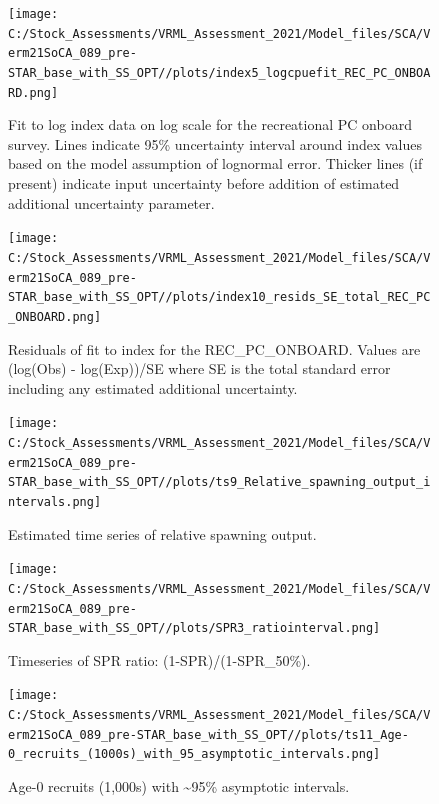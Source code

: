 \documentclass[11pt,
  english,
  a4paper,
]{article}
\begin{document}
\begin{figure}
\centering
\texttt{[image: C:/Stock\_Assessments/VRML\_Assessment\_2021/Model\_files/SCA/Verm21SoCA\_089\_pre-STAR\_base\_with\_SS\_OPT//plots/index5\_logcpuefit\_REC\_PC\_ONBOARD.png]}
\caption{Fit to log index data on log scale for the recreational PC onboard survey. Lines indicate 95\% uncertainty interval around index values based on the model assumption of lognormal error. Thicker lines (if present) indicate input uncertainty before addition of estimated additional uncertainty parameter.\label{fig:log-cpue-REC-PC-ONBOARD}}
\end{figure}

\begin{figure}
\centering
\texttt{[image: C:/Stock\_Assessments/VRML\_Assessment\_2021/Model\_files/SCA/Verm21SoCA\_089\_pre-STAR\_base\_with\_SS\_OPT//plots/index10\_resids\_SE\_total\_REC\_PC\_ONBOARD.png]}
\caption{Residuals of fit to index for the REC\_PC\_ONBOARD. Values are (log(Obs) - log(Exp))/SE where SE is the total standard error including any estimated additional uncertainty.\label{fig:cpue-resid-REC-PC-ONBOARD}}
\end{figure}

\FloatBarrier

\FloatBarrier

\begin{figure}
\centering
\texttt{[image: C:/Stock\_Assessments/VRML\_Assessment\_2021/Model\_files/SCA/Verm21SoCA\_089\_pre-STAR\_base\_with\_SS\_OPT//plots/ts9\_Relative\_spawning\_output\_intervals.png]}
\caption{Estimated time series of relative spawning output.\label{fig:depl}}
\end{figure}

\FloatBarrier

\begin{figure}
\centering
\texttt{[image: C:/Stock\_Assessments/VRML\_Assessment\_2021/Model\_files/SCA/Verm21SoCA\_089\_pre-STAR\_base\_with\_SS\_OPT//plots/SPR3\_ratiointerval.png]}
\caption{Timeseries of SPR ratio: (1-SPR)/(1-SPR\_50\%).\label{fig:1-spr}}
\end{figure}

\begin{figure}
\centering
\texttt{[image: C:/Stock\_Assessments/VRML\_Assessment\_2021/Model\_files/SCA/Verm21SoCA\_089\_pre-STAR\_base\_with\_SS\_OPT//plots/ts11\_Age-0\_recruits\_(1000s)\_with\_95\_asymptotic\_intervals.png]}
\caption{Age-0 recruits (1,000s) with \textasciitilde95\% asymptotic intervals.\label{fig:recruits}}
\end{figure}
\end{document}
